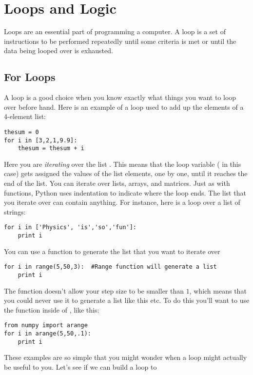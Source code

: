 \chapter{Loops and Logic}
\label{chap:LoopsLogic}

Loops are an essential part of programming a computer. A loop is a set
of instructions to be performed repeatedly until some criteria is met
or until the data being looped over is exhausted.

\section{For Loops}
A  loop is a good choice when you know exactly what things you want
to loop over before hand.  Here is an example of a  loop
used to add up the elements of a 4-element list:
\begin{Verbatim}
thesum = 0
for i in [3,2,1,9.9]:
    thesum = thesum + i
\end{Verbatim}
Here you are {\it iterating} over the list \code{[3,2,1,9.9]}.  This
means that the loop variable ( in this case) gets assigned
the values of the list elements, one by one, until it reaches the end
of the list.  You can iterate over lists, arrays, and
matrices.  Just as with functions, Python uses indentation to indicate
where the loop ends.    The list
that you iterate over can contain anything.  For instance, here is a loop over a list of
strings:
\begin{Verbatim}
for i in ['Physics', 'is','so','fun']:
    print i
\end{Verbatim}
You can use a function to generate the list that you want to iterate
over
\begin{Verbatim}
for i in range(5,50,3):  #Range function will generate a list
    print i
\end{Verbatim}
The  function doesn't allow your step size to be smaller
than $1$, which means that you could never use it to generate a list
like this  etc.  To do this you'll want to use the
 function inside of , like this:
\begin{Verbatim}
from numpy import arange
for i in arange(5,50,.1):
    print i
\end{Verbatim}
These examples are so simple that you might wonder when a loop might
actually be useful to you.  Let's see if we can build a loop to
